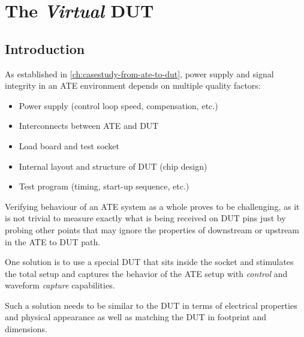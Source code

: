 

\chapter{The \emph{Virtual} \acs{DUT}}
\label{ch:the-vdut}



\section{Introduction}
\label{sec:ch-vdut-introduction}

As established in \autoref{ch:casestudy-from-ate-to-dut}, power supply and
signal integrity in an \ac{ATE} environment depends on multiple
quality factors:

\begin{itemize}[topsep=8pt,itemsep=4pt,partopsep=4pt, parsep=4pt]
    \item Power supply (control loop speed, compensation, etc.)
    \item Interconnects between \ac{ATE} and \ac{DUT}
    \item Load board and test socket
    \item Internal layout and structure of \ac{DUT} (chip design)
    \item Test program (timing, start-up sequence, etc.)
\end{itemize}

Verifying behaviour of an \ac{ATE} system as a whole proves to be
challenging, as it is not trivial to measure exactly what is being received
on \ac{DUT} pins just by probing other points that may ignore the properties
of downstream or upstream in the \ac{ATE} to \ac{DUT} path.

One solution is to use a special \ac{DUT} that sits inside
the socket and stimulates the total setup and captures the behavior of
the \ac{ATE} setup with \emph{control} and waveform \emph{capture} capabilities.

Such a solution needs to be similar to the \ac{DUT} in terms of electrical
properties and physical appearance as well as matching the \ac{DUT} in
footprint and dimensions.




